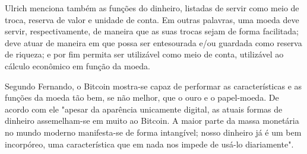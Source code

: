 Ulrich menciona também as funções do dinheiro, listadas de servir como meio de troca, reserva de valor e unidade de conta. Em outras palavras, uma moeda deve servir, respectivamente, de maneira que as suas trocas sejam de forma facilitada; deve atuar de maneira em que possa ser entesourada e/ou guardada como reserva de riqueza; e por fim permita ser utilizável como meio de conta, utilizável ao cálculo econômico em função da moeda.

Segundo Fernando, o Bitcoin mostra-se capaz de performar as características e as funções da moeda tão bem, se não melhor, que o ouro e o papel-moeda. De acordo com ele "apesar da aparência unicamente digital, as atuais formas de dinheiro assemelham-se em muito ao Bitcoin. A maior parte da massa monetária no mundo moderno manifesta-se de forma intangível; nosso dinheiro já é um bem incorpóreo, uma característica que em nada nos impede de usá-lo diariamente"\cite[p.95]{Ulrich2014}.


